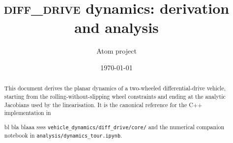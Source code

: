 \documentclass[11pt]{article}
\title{\textsc{diff\_drive} dynamics: derivation and analysis}
\author{Atom project}
\date{\today}
\begin{document}
\maketitle

\begin{abstract}
This document derives the planar dynamics of a two-wheeled differential-drive
vehicle, starting from the rolling-without-slipping wheel constraints and
ending at the analytic Jacobians used by the linearisation. It is the
canonical reference for the C++ implementation in

bl bla blaaa  ssss
\texttt{vehicle\_dynamics/diff\_drive/core/} and the numerical companion notebook in
\texttt{analysis/dynamics\_tour.ipynb}.
\end{abstract}

\tableofcontents
\bigskip







\end{document}
